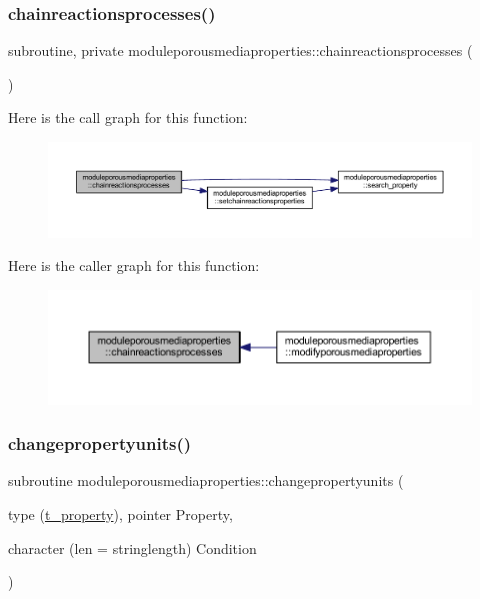 \subsubsection{\texorpdfstring{chainreactionsprocesses()}{chainreactionsprocesses()}}
{\footnotesize\ttfamily subroutine, private moduleporousmediaproperties\+::chainreactionsprocesses (\begin{DoxyParamCaption}{ }\end{DoxyParamCaption})\hspace{0.3cm}{\ttfamily [private]}}

Here is the call graph for this function\+:\nopagebreak
\begin{figure}[H]
\begin{center}
\leavevmode
\includegraphics[width=350pt]{namespacemoduleporousmediaproperties_aa89aee3f1e3ab0673669acd8126824f9_cgraph}
\end{center}
\end{figure}
Here is the caller graph for this function\+:\nopagebreak
\begin{figure}[H]
\begin{center}
\leavevmode
\includegraphics[width=350pt]{namespacemoduleporousmediaproperties_aa89aee3f1e3ab0673669acd8126824f9_icgraph}
\end{center}
\end{figure}
\mbox{\label{namespacemoduleporousmediaproperties_a4f575711195b1879221a0c494292c90c}} 
\subsubsection{\texorpdfstring{changepropertyunits()}{changepropertyunits()}}
{\footnotesize\ttfamily subroutine moduleporousmediaproperties\+::changepropertyunits (\begin{DoxyParamCaption}\item[{type (\mbox{\hyperlink{structmoduleporousmediaproperties_1_1t__property}{t\+\_\+property}}), pointer}]{Property,  }\item[{character (len = stringlength)}]{Condition }\end{DoxyParamCaption})\hspace{0.3cm}{\ttfamily [private]}}

